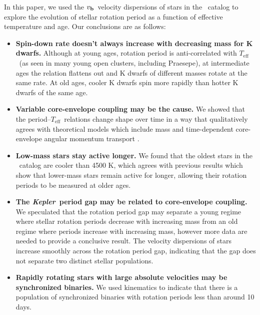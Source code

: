 \documentclass{aastex63}
\newcommand{\kepler}{{\it Kepler}}
\newcommand{\teff}{$T_{\mathrm{eff}}$}
\newcommand{\vb}{$v_{\bf b}$}
\newcommand{\mct}{\citet{mcquillan2014}}
\begin{document}
In this paper, we used the \vb\ velocity dispersions of stars in the \mct\
catalog to explore the evolution of stellar rotation period as a function of
effective temperature and age.
Our conclusions are as follows:
\begin{itemize}
\item{{\bf Spin-down rate doesn't always increase with decreasing mass for K
    dwarfs.}
Although at young ages, rotation period is anti-correlated with \teff\ (as
seen in many young open clusters, including Praesepe), at intermediate ages the
relation flattens out and K dwarfs of different masses rotate at the same
rate.
At old ages, cooler K dwarfs spin more rapidly than hotter K dwarfs of the
same age.}

\item{{\bf Variable core-envelope coupling may be the cause.} We showed that
the period--\teff\ relations change shape over time in a way that
qualitatively agrees with theoretical models which include mass and
time-dependent core-envelope angular momentum transport \citep{spada2019}.}

\item{{\bf Low-mass stars stay active longer.}
We found that the oldest stars in the \mct\ catalog are cooler than 4500
K, which agrees with previous results which show that lower-mass stars remain
        active for longer, allowing their rotation periods to be measured at
        older ages.}

\item{{\bf The \kepler\ period gap may be related to core-envelope coupling.}
We speculated that the rotation period gap \citep{mcquillan2014} may separate
a young regime where stellar rotation periods decrease with increasing mass
from an old regime where periods increase with increasing mass, however more
data are needed to provide a conclusive result.
The velocity dispersions of stars increase smoothly across the rotation period
gap, indicating that the gap does not separate two distinct stellar
populations.}

\item{{\bf Rapidly rotating stars with large absolute velocities may be
synchronized binaries.}
We used kinematics to indicate that there is a population of
synchronized binaries with rotation periods less than around 10 days.}


\end{itemize}
\end{document}
